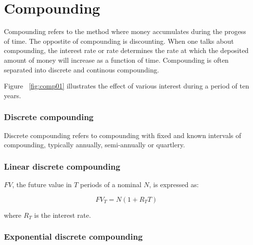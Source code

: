 \documentclass[11pt,a4paper]{article}
\numberwithin{equation}{section}
\begin{document}
\section{Compounding}
Compounding refers to the method where money accumulates during the progess of time. The oppostite of compounding is discounting.
When one talks about compounding, the interest rate or rate determines the rate at which the deposited amount of money will increase as a function of time.
Compounding is often separated into discrete and continous compounding.

Figure ~\ref{fig:comp01} illustrates the effect of various interest during a period of ten years.

\begin{minipage}{\linewidth}
\label{fig:comp01}
\end{minipage}

\subsubsection{Discrete compounding}
Discrete compounding refers to compounding with fixed and known intervals of compounding, typically annually, semi-annually or quartlery.

\subsubsection{Linear discrete compounding}
$FV$, the future value in $T$ periods of a nominal $N$, is expressed as:

\[
FV_T = N(1+R_TT)
\]

where $R_T$ is the interest rate.

\subsubsection{Exponential discrete compounding}
\end{document}
